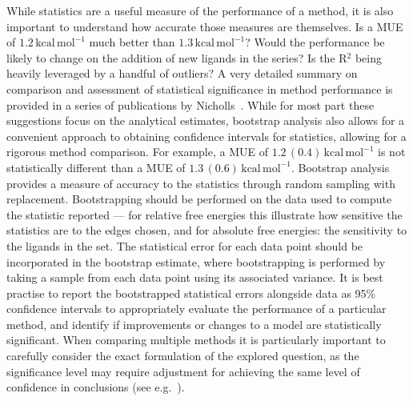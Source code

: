 \documentclass[9pt,bestpractices,pubversion]{livecoms}
\begin{document}
While statistics are a useful measure of the performance of a method, it is also important to understand how accurate those measures are themselves. Is a MUE of $1.2\,\mathrm{kcal\,mol^{-1}}$ much better than $1.3\,\mathrm{kcal\,mol^{-1}}$? Would the performance be likely to change on the addition of new ligands in the series? Is the R$^2$ being heavily leveraged by a handful of outliers? 
A very detailed summary on comparison and assessment of statistical significance in method performance is provided in a series of publications by Nicholls~\cite{nicholls2008we,nicholls2011we,nicholls2014confidence,nicholls2016part2}. While for most part these suggestions focus on the analytical estimates, bootstrap analysis also allows for a convenient approach to obtaining confidence intervals for statistics, allowing for a rigorous method comparison. For example, a MUE of $1.2\,(0.4)\,\mathrm{kcal\,mol^{-1}}$ is not statistically different than a MUE of $1.3\,(0.6)\,\mathrm{kcal\,mol^{-1}}$. Bootstrap analysis provides a measure of accuracy to the statistics through random sampling with replacement. Bootstrapping should be performed on the data used to compute the statistic reported --- for relative free energies this illustrate how sensitive the statistics are to the edges chosen, and for absolute free energies: the sensitivity to the ligands in the set. The statistical error for each data point should be incorporated in the bootstrap estimate, where bootstrapping is performed by taking a sample from each data point using its associated variance. It is best practise to report the bootstrapped statistical errors alongside data as 95\% confidence intervals to appropriately evaluate the performance of a particular method, and identify if improvements or changes to a model are statistically significant. 
%
When comparing multiple methods it is particularly important to carefully consider the exact formulation of the explored question, as the significance level may require adjustment for achieving the
same level of confidence in conclusions (see e.g.~\cite{nicholls2016part2}).


\end{document}
